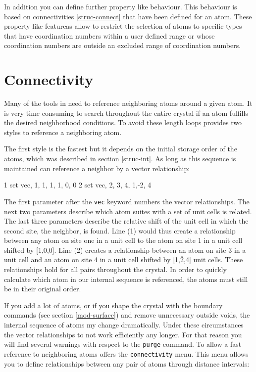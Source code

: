 In addition you can define further property like behaviour. 
This behaviour is based on connectivities \ref{struc-connect} that have 
been defined for an atom. These property like featureas allow to 
restrict the selection of atoms to specific types that have 
coordination numbers within a user defined range or whose 
coordination numbers are outside an excluded range of coordination
numbers.


\section{Connectivity \label{struc-connect}}

Many of the tools in \Discus need to reference neighboring atoms around
a given atom. It is very time consuming to search throughout the entire
crystal if an atom fulfills the desired neighborhood conditions. To 
avoid these length loops \Discus provides two styles to reference a 
neighboring atom. 

The first style is the fastest but it depends on the initial storage 
order of the atoms, which was described in section \ref{struc-int}. As
long as this sequence is maintained \Discus can reference a neighbor by
a vector relationship:

\begin{MacVerbatim} 
  1   set vec, 1,  1, 1,   1, 0, 0
  2   set vec, 2,  3, 4,   1,-2, 4
\end{MacVerbatim} 

The first parameter after the {\tt vec} keyword numbers the vector 
relationships. The next two parameters describe which atom suites with
a set of unit cells is related. The last three parameters describe the 
relative shift of the unit cell in which the second site, the neighbor, 
is found.  Line (1) would thus create a relationship between any atom
on site one in a unit cell to the atom on site 1 in a unit cell 
shifted by [1,0,0]. Line (2) creates a relationship between an atom
on site 3 in a unit cell and an atom on site 4 in a unit cell shifted 
by [1,$\overline{2}$,4] unit cells. These relationships hold for all
pairs throughout the crystal. In order to quickly calculate which 
atom in our internal sequence is referenced, the atoms must still be in 
their original order.

If you add a lot of atoms, or if you shape the crystal with the 
boundary commands (see section \ref{mod-surface}) and remove 
unnecessary outside voids, the internal sequence of atoms my change
dramatically. Under these circumstances the vector relationships 
to not work efficiently any longer. For that reason you will find 
several warnings with respect to the {\tt purge} command. To allow
a fast reference to neighboring atoms \Discus offers the 
{\tt connectivity} menu. This menu allows you to define relationships
between any pair of atoms through distance intervals:

